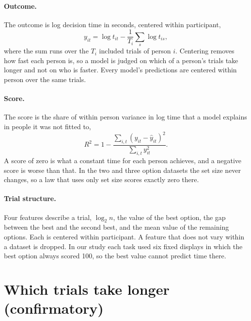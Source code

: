\documentclass[11pt]{article}
\newcommand{\Rtwo}{R^2}
\begin{document}
\paragraph{Outcome.} The outcome is log decision time in seconds, centered within participant,
\begin{equation}
y_{it} = \log t_{it} - \frac{1}{T_i}\sum_{s} \log t_{is},
\end{equation}
where the sum runs over the $T_i$ included trials of person $i$. Centering removes how fast each person is, so a model is judged on which of a person's trials take longer and not on who is faster. Every model's predictions are centered within person over the same trials.

\paragraph{Score.} The score is the share of within person variance in log time that a model explains in people it was not fitted to,
\begin{equation}
\Rtwo = 1 - \frac{\sum_{i,t} (y_{it} - \hat y_{it})^2}{\sum_{i,t} y_{it}^2}.
\end{equation}
A score of zero is what a constant time for each person achieves, and a negative score is worse than that. In the two and three option datasets the set size never changes, so a law that uses only set size scores exactly zero there.

\paragraph{Trial structure.} Four features describe a trial, $\log_2 n$, the value of the best option, the gap between the best and the second best, and the mean value of the remaining options. Each is centered within participant. A feature that does not vary within a dataset is dropped. In our study each task used six fixed displays in which the best option always scored 100, so the best value cannot predict time there.

\section{Which trials take longer (confirmatory)}
\label{sec:structure}
\end{document}
